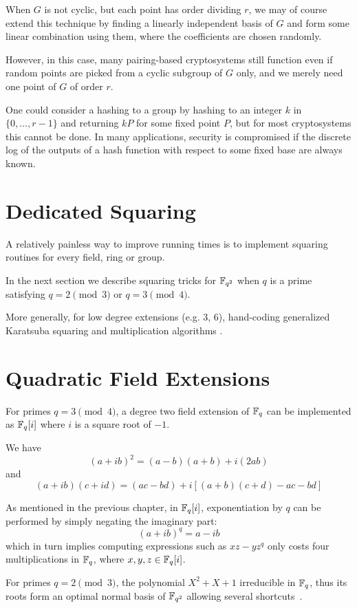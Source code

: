 When $G$ is not cyclic, but each point has order dividing $r$,
we may of course extend this technique by finding a linearly independent
basis of $G$ and form some linear combination using them,
where the coefficients are chosen randomly.

However, in this case,
many pairing-based cryptosystems still function even if random
points are picked from a cyclic subgroup of $G$ only, and we merely need
one point of $G$ of order $r$.

One could consider a hashing to a group by
hashing to an integer $k$ in $\{0,...,r-1\}$ and returning $kP$
for some fixed point $P$, but for most cryptosystems this cannot be done.
In many applications, security is compromised if the discrete log of
the outputs of a hash function with respect to some fixed base are always
known.

\section{Dedicated Squaring}

A relatively painless way to improve running times
is to implement squaring routines for every field, ring or group.

In the next section we describe squaring tricks
for $\mathbb{F}_{q^2}$ when $q$ is a prime satisfying $q = 2 \pmod 3$
or $q = 3 \pmod 4$.

More generally, for low degree extensions (e.g. 3, 6),
hand-coding generalized Karatsuba squaring and
multiplication algorithms \cite{wpkaratsuba}.

\section{Quadratic Field Extensions}

For primes $q=3\pmod 4$, a degree two field extension of $\mathbb{F}_q$
can be implemented as $\mathbb{F}_q[i]$ where $i$ is a square root of $-1$.

We have
\[ (a + i b)^2 = (a - b)(a + b) + i (2 a b) \]
and
\[ (a + i b)(c + i d) = (ac - bd) + i[(a + b)(c + d) - ac - bd] \]

As mentioned in the previous chapter, in $\mathbb{F}_q[i]$,
exponentiation by $q$ can be performed by simply negating the imaginary part:
\[ (a+ib)^q = a - ib \]
which in turn implies computing expressions such as $x z - y z^q$ only
costs four multiplications in $\mathbb{F}_q$, where $x,y,z \in \mathbb{F}_q[i]$.

For primes $q=2\pmod 3$,
the polynomial $X^2 + X + 1$ irreducible in $\mathbb{F}_q$, thus its roots
form an optimal normal basis of $\mathbb{F}_{q^2}$
allowing several shortcuts~\cite{xtr}.

